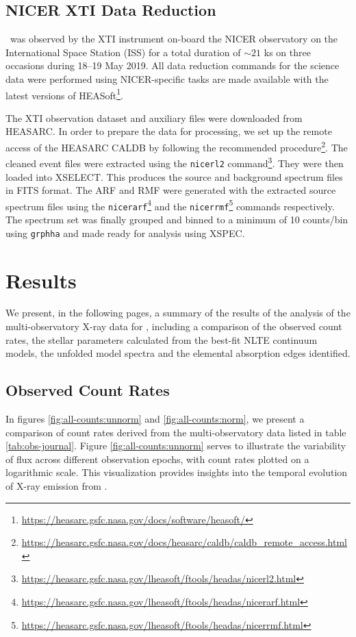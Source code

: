     	\subsection{NICER XTI Data Reduction} \label{multi-obs:red-analysis:xti}
    		\source\ was observed by the XTI instrument on-board the NICER observatory on the International Space Station (ISS) for a total duration of $\sim 21$ ks on three occasions during 18--19 May 2019. All data reduction commands for the science data were performed using NICER-specific tasks are made available with the latest versions of HEASoft\footnote{\url{https://heasarc.gsfc.nasa.gov/docs/software/heasoft/}}.
    	
	    	The XTI observation dataset and auxiliary files were downloaded from HEASARC. In order to prepare the data for processing, we set up the remote access of the HEASARC CALDB by following the recommended procedure\footnote{\url{https://heasarc.gsfc.nasa.gov/docs/heasarc/caldb/caldb_remote_access.html}}. The cleaned event files were extracted using the \texttt{nicerl2} command\footnote{\url{https://heasarc.gsfc.nasa.gov/lheasoft/ftools/headas/nicerl2.html}}. They were then loaded into XSELECT. This produces the source and background spectrum files in FITS format. The ARF and RMF were generated with the extracted source spectrum files using the \texttt{nicerarf}\footnote{\url{https://heasarc.gsfc.nasa.gov/lheasoft/ftools/headas/nicerarf.html}} and the \texttt{nicerrmf}\footnote{\url{https://heasarc.gsfc.nasa.gov/lheasoft/ftools/headas/nicerrmf.html}} commands respectively. The spectrum set was finally grouped and binned to a minimum of 10 counts/bin using \texttt{grphha} and made ready for analysis using XSPEC.
    	
    \section{Results} \label{multi-obs:results}
    	We present, in the following pages, a summary of the results of the analysis of the multi-observatory X-ray data for \source, including a comparison of the observed count rates, the stellar parameters calculated from the best-fit NLTE continuum models, the unfolded model spectra and the elemental absorption edges identified.
    	
    	
    	\subsection{Observed Count Rates} \label{multi-obs:results:count-rates}
    		In figures \ref{fig:all-counts:unnorm} and \ref{fig:all-counts:norm}, we present a comparison of count rates derived from the multi-observatory data listed in table \ref{tab:obs-journal}. Figure \ref{fig:all-counts:unnorm} serves to illustrate the variability of flux across different observation epochs, with count rates plotted on a logarithmic scale. This visualization provides insights into the temporal evolution of X-ray emission from \source.
    		
